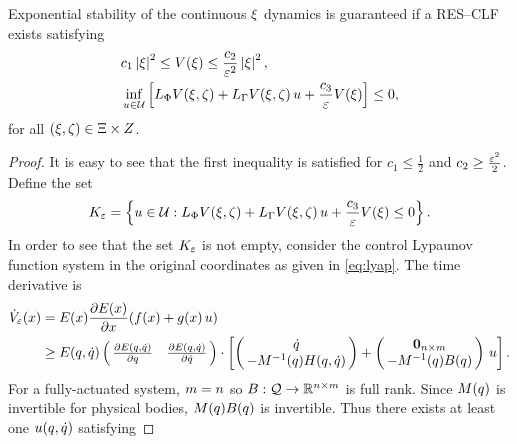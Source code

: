\begin{proposition}  
  \label{prop:res-clf}
  Exponential stability of the continuous $\xi$ dynamics is guaranteed if a
  RES--CLF exists satisfying
  \begin{eqnarray}
    \label{eq:lyap-cond-nrg-es}
    &c_{1} \left|\xi\right|^{2} \leq V(\xi) \leq \frac{c_{2}}{\varepsilon^{2}} \left|\xi\right|^2,\\
    \nonumber
    &\inf_{u \in \mathcal{U}} \left[ L_{\Phi} V(\xi, \zeta) + L_{\Gamma} V(\xi, \zeta) \, u + \frac{c_{3}}{\varepsilon} V(\xi) \right] \leq 0,
  \end{eqnarray}
  for all $(\xi, \zeta) \in \Xi \times Z$.\vgap
\end{proposition}


\begin{proof}
  It is easy to see that the first inequality is satisfied for $c_{1} \leq
  \frac{1}{2}$ and $c_{2} \geq \frac{\varepsilon^{2}}{2}$.
  Define the set
  \begin{align}
    K_{\varepsilon} = \left\{ u \in \mathcal{U} : L_{\Phi} V(\xi, \zeta) + L_{\Gamma} V(\xi, \zeta)
      \, u + \frac{c_{3}}{\varepsilon} V(\xi) \leq 0 \right\}.
    \label{eq:control-set}
  \end{align}
  In order to see that the set $K_{\varepsilon}$ is not empty, consider the control
  Lypaunov function system in the original coordinates as given in
  \eqref{eq:lyap}.
  The time derivative is
  \begin{align*}
    \dVe(\x) &= \E(\x) \pd{\E(\x)}{\x}(f(\x) + g(\x) \, \uu)\\
    &\geq \E(\q, \dq) \left(\!\!\begin{array}{c c}
    \pd{\E(\q, \dq)}{\q} & \pd{\E(\q, \dq)}{\dq}
    \end{array}\!\!\right) \cdot
    \left[
      \left(\!\!\begin{array}{c}
      \dq\\
      -\M^{-1}(\q) \CG(\q, \dq)
      \end{array}\!\!\right) +
      \left(\!\!\begin{array}{c}
      \boldzero_{\ndim \times \ncv}\\
      -\M^{-1}(\q) \B(\q)
      \end{array}\!\!\right) \, \uu
      \right].
  \end{align*}
  For a fully-actuated system, $m = n$ so $B : \mathcal{Q} \to \mathbb{R}^{n \times
    m}$ is full rank.
  Since $M(q)$ is invertible for physical bodies, $M(q) B(q)$ is invertible.
  Thus there exists at least one $u(q, \dot{q})$ satisfying

\end{proof}
